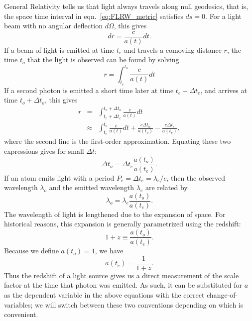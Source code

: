 General Relativity tells us
that light always travels along null geodesics, that is, the space time
interval in eqn.~\ref{eq:FLRW_metric} satisfies $ds = 0$.  For a light
beam with no angular deflection $d\Omega$, this gives
\begin{equation}
  dr = \frac{c}{a(t)} dt.
\end{equation}
If a beam of light is emitted at time $t_e$ and travels
a comoving distance $r$, the
time $t_o$ that the light is observed can be found by solving
\begin{equation}
  r = \int_{t_e}^{t_o} \frac{c}{a(t)} dt
\end{equation}
If a second photon is emitted a short time later at time $t_e + \Delta t_e$,
and arrives at time $t_o + \Delta t_o$, this gives
\begin{eqnarray}
  r &=& 
  \int_{t_e + \Delta t_e}^{t_o + \Delta t_o} \frac{c}{a(t)} dt \nonumber\\
  &\approx& \int_{t_e}^{t_o} \frac{c}{a(t)} dt + \frac{c\Delta t_o}{a(t_o)}
  - \frac{c\Delta t_e}{a(t_e)},
\end{eqnarray}
where the second line is the first-order approximation.  Equating these
two expressions gives for small $\Delta t$:
\begin{equation}
  \label{eq:time_dialation}
  \Delta t_o = \Delta t_e \frac{a(t_o)}{a(t_e)}.
\end{equation}
If an atom emits light with a period 
$P_e = \Delta t_e = \lambda_e / c$, then the observed wavelength $\lambda_o$
and the emitted wavelength $\lambda_e$ are related by
\begin{equation}
  \lambda_o = \lambda_e \frac{a(t_o)}{a(t_e)}.
\end{equation}
The wavelength of light is lengthened due to the expansion of space.  For
historical reasons, this expansion is generally parametrized using the
redshift:
\begin{equation}
  1 + z \equiv \frac{a(t_o)}{a(t_e)}.
\end{equation}
Because we define $a(t_o) = 1$, we have
\begin{equation}
  a(t_e) = \frac{1}{1 + z}.
\end{equation}
Thus the redshift of a light source gives us a direct measurement of the
scale factor at the time that photon was emitted.  As such, it can be
substituted for $a$ as the dependent variable in the above equations
with the correct change-of-variables; we will switch between these two
conventions depending on which is convenient.

